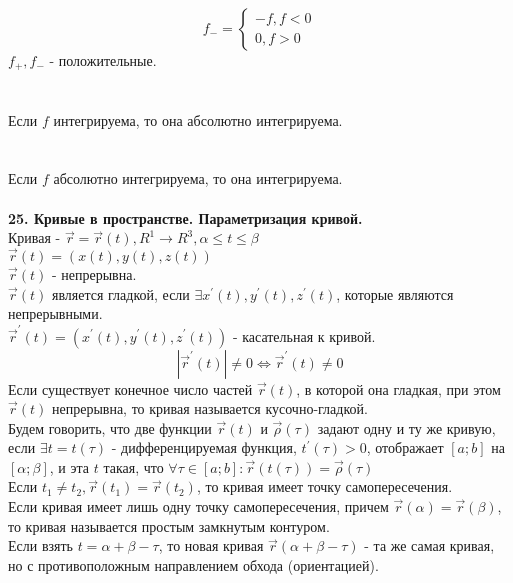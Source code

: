 \documentclass[12pt]{article}
\begin{document}
$$f_{-} = \begin{cases}-f, f<0 \\ 0, f>0 \end{cases}$$
$f_{+}, f_{-}$ - положительные.\\
\\
\\
Если $f$ интегрируема, то она абсолютно интегрируема.\\
\\
\\
Если $f$ абсолютно интегрируема, то она интегрируема.\\
\\
\label{question25}\textbf{25. Кривые в пространстве. Параметризация кривой.}\\
Кривая - $\overrightarrow{r} = \overrightarrow{r}(t), R^1 \to R^3, \alpha \leq t \leq \beta$\\
$\overrightarrow{r}(t) = (x(t),y(t),z(t))$\\
$\overrightarrow{r}(t)$ - непрерывна.\\
$\overrightarrow{r}(t)$ является гладкой, если $\exists x^{'}(t), y^{'}(t), z^{'}(t)$, которые являются непрерывными.\\
$\overrightarrow{r}^{'}(t) = (x^{'}(t),y^{'}(t),z^{'}(t))$ - касательная к кривой.\\
$$|\overrightarrow{r}^{'}(t)| \neq 0 \iff \overrightarrow{r}^{'}(t) \neq 0$$
Если существует конечное число частей $\overrightarrow{r}(t)$, в которой она гладкая, при этом $\overrightarrow{r}(t)$ непрерывна, то кривая называется кусочно-гладкой.\\
Будем говорить, что две функции $\overrightarrow{r}(t)$ и $\overrightarrow{\rho}(\tau)$ задают одну и ту же кривую, если $\exists t = t(\tau)$ - дифференцируемая функция, $t^{'}(\tau)>0$, отображает $[a;b]$ на $[\alpha; \beta]$, и эта $t$ такая, что $\forall \tau \in [a;b] : \overrightarrow{r}(t(\tau))=\overrightarrow{\rho}(\tau)$\\
Если $t_1 \neq t_2, \overrightarrow{r}(t_1)=\overrightarrow{r}(t_2)$, то кривая имеет точку самопересечения.\\
Если кривая имеет лишь одну точку самопересечения, причем $\overrightarrow{r}(\alpha)=\overrightarrow{r}(\beta)$, то кривая называется простым замкнутым контуром.\\
Если взять $t = \alpha + \beta - \tau$, то новая кривая $\overrightarrow{r}(\alpha + \beta - \tau)$ - та же самая кривая, но с противоположным направлением обхода (ориентацией).\\
\end{document}
